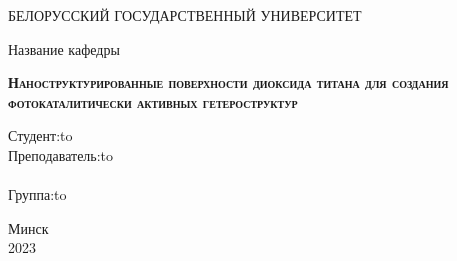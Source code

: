 \documentclass[oneside,final,12pt]{extreport}
\begin{document}
\begin{titlepage}
\newpage

\begin{center}
	БЕЛОРУССКИЙ  ГОСУДАРСТВЕННЫЙ УНИВЕРСИТЕТ \\
\end{center}

\vspace{12em}


\begin{center}
	\Large Название кафедры \\ 
\end{center}

\vspace{2em}

\begin{center}
	\textsc{
		\textbf{Наноструктурированные поверхности  диоксида титана для создания фотокаталитически активных гетероструктур}
	}
\end{center}

\vspace{6em}

\newbox{\lbox}
\newlength{\maxl}
\setlength{\maxl}{\wd\lbox}
\hfill\parbox{11cm}{
\hspace*{5cm}\hspace*{-5cm}Студент:\hfill\hbox to\\
\hspace*{5cm}\hspace*{-5cm}Преподаватель:\hfill\hbox to\\
\\
\hspace*{5cm}\hspace*{-5cm}Группа:\hfill\hbox to\\
}


\vspace{\fill}

\begin{center}
Минск \\2023
\end{center}

\end{titlepage}

\tableofcontents
\end{document}
